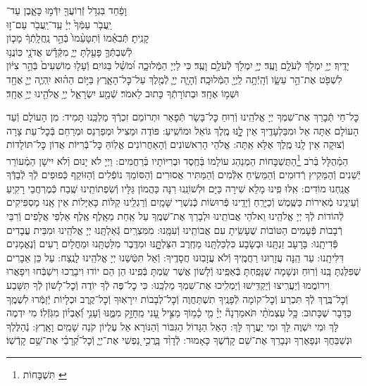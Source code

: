 \documentclass[twoside, openany, parskip=half, 11pt]{book}
\begin{document}
וָפַ֔חַד \hfill בִּגְדֹ֥ל זְֿרֽוֹעֲךָ֖ יִדְּֿמ֣וּ כָּאָ֑בֶן \hfill עַד־\\
יַֽעֲבֹ֤ר עַמְּֿךָ֙ יְיָ֔ \hfill עַֽד־יַֽעֲבֹ֖ר עַם־ז֣וּ \\
קָנִֽיתָ׃ \hfill תְּֿבִאֵ֗מוֹ וְֿתִטָּעֵ֨מוֹ֙ בְּֿהַ֣ר נַֽחֲלָֽתְֿךָ֔ \hfill מָכ֧וֹן \\
לְֿשִׁבְתְּֿךָ֛ פָּעַ֖לְתָּ יְיָ֑ \hfill מִקְּֿדָ֕שׁ אֲדֹנָ֖י כּֽוֹנֲנ֥וּ \\
יָדֶֽיךָ׃ \hfill יְיָ֥ יִמְלֹ֖ךְ לְֿעֹלָ֥ם וָעֶֽד׃\hfill \break
יְיָ֥ יִמְלֹ֖ךְ לְֿעֹלָ֥ם וָעֶֽד׃
כִּי לַיְיָ הַמְּֿלוּכָ֑ה וּ֝מֹשֵׁ֗ל בַּגּוֹיִֽם׃
וְֿעָל֤וּ מֽוֹשִׁעִים֙ בְּֿהַ֣ר צִיּ֔וֹן לִשְׁפֹּ֖ט אֶת־הַ֣ר עֵשָׂ֑ו וְֿהָֽיְֿתָ֥ה לַֽיְיָ֖ הַמְּֿלוּכָֽה׃
וְֿהָיָ֧ה יְיָ֛ לְֿמֶ֖לֶךְ עַל־כׇּל־הָאָ֑רֶץ בַּיּ֣וֹם הַה֗וּא יִֽהְיֶ֧ה יְיָ֛ אֶחָ֖ד וּשְׁמ֥וֹ אֶחָֽד׃
וּבְתוֹרָתְֿךָ כָּתוּב לֵאמֹר׃
שְֿׁמַ֖ע יִשְׂרָאֵ֑ל יְיָ֥ אֱלֹהֵ֖ינוּ יְיָ֥ אֶחָֽד׃

\enlargethispage{.5\baselineskip}
\label{nishmas}
כׇּל־חַי תְּֿבָרֵךְ אֶת־שִׁמְךָ יְיָ אֱלֹהֵֽינוּ וְֿרֽוּחַ כׇּל־בָּשָׂר תְּֿפָאֵר וּתְרוֹמֵם זִכְרְֿךָ מַלְכֵּֽנוּ תָּמִיד: מִן הָעוֹלָם וְֿעַד הָעוֹלָם אַתָּה אֵל וּמִבַּלְעָדֶֽיךָ אֵין לׇׇָֽנּוּ מֶֽלֶךְ גּוֹאֵל וּמוֹשִֽׁיעַ:
פּוֹדֶה וּמַצִיל וּמְפַרְנֵס וּמְרַחֵם בְּֿכׇל־עֵת צָרָה וְֿצוּקָה אֵין לָֽנוּ מֶֽלֶךְ אֶלָּא אַֽתָּה: אֱלֹהֵי הָרִאשׁוֹנִים וְֿהָאַחֲרוֹנִים אֱלֽוֹהַּ כׇּל־בְּֿרִיּוֹת אֲדוֹן כׇּל־תּוֹלָדוֹת הַמְֿהֻלָּל בְּֿרֹב \footnote{תִּשְׁבָּחוֹת \label{xx}}הַתֻּשְׁבָּחוֹת הַמְנַהֵג עוֹלָמוֹ בְּֿחֶֽסֶד וּבְרִיּוֹתָיו בְּֿרַחֲמִים: וַיְיָ לֹא יָנוּם וְֿלֹא יִישָׁן הַמְֿעוֹרֵר יְֿשֵׁנִים וְֿהַמֵּקִיץ רְֿדוּמִים וְֿהַמֵּשִֽׂיחַ אִלְּֿמִים וְֿהַמַּתִּיר אֲסוּרִים וְֿהַסּוֹמֵךְ נוֹפְֿלִים וְֿהַזּוֹקֵף כְּֿפוּפִים לְֿךָ לְֿבַדְּֿךָ אֲנַֽחְנוּ מוֹדִים: אִֽלּוּ פִֽינוּ מָלֵא שִׁירָה כַּיָּם וּלְשׁוֹנֵֽנוּ רִנָּה כַּהֲמוֹן גַּלָּיו וְֿשִׂפְתוֹתֵֽינוּ שֶֽׁבַח כְּֿמֶרְחֲבֵי רָקִֽיעַ וְֿעֵינֵֽינוּ מְֿאִירוֹת כַּשֶּֽׁמֶשׁ וְֿכַיָּרֵֽחַ וְֿיָדֵֽינוּ פְּֿרוּשׂוֹת כְּֿנִשְׁרֵי שָּׁמָֽיִם וְֿרַגְלֵֽינוּ קַלּוֹת כָּאַיָּלוֹת אֵין אָֽנוּ מַסְפִּיקִים לְֿהוֹדוֹת לְֿךָ יְיָ אֱלֹהֵֽינוּ וֵאלֹהֵי אֲבוֹתֵֽינוּ וּלְבָרֵךְ אֶת־שְׁמֶֽךָ עַל אַֽחַת מֵאָֽלֶף אֶֽלֶף אַלְפֵי אֲלָפִים וְֿרִבֵּי רְֿבָבוֹת פְּֿעָמִים הַטּוֹבוֹת שֶׁעָשִֽׂיתָ עִם אֲבוֹתֵֽינוּ וְֿעִמָּֽנוּ: מִמִּצְרַֽיִם גְּֿאַלְתָּֽנוּ יְיָ אֱלֹהֵֽינוּ וּמִבֵּית עֲבָדִים פְּֿדִיתָֽנוּ: בָּרָעָב זַנְתָּֽנוּ וּבְשָׂבָע כִּלְכַּלְתָּֽנוּ מֵחֶֽרֶב הִצַּלְתׇׇָּֽנּוּ וּמִדֶּֽבֶר מִלַּטְתָּֽנוּ וּמֵחֳלָיִם רָעִים וְֿנֶאֱמָנִים דִּלִּיתָֽנוּ: עַד הֵֽנָּה עֲזָרֽוּנוּ רַחֲמֶֽיךָ וְֿלֹא עֲזָבֽוּנוּ חֲסָדֶֽיךָ: וְֿאַל תִּטְּֿשֵׁנוּ יְיָ אֱלֹהֵֽינוּ לָנֶֽצַח: עַל כֵּן אֵבָרִים שֶׁפִּלַּגְתָּ בָּֽנוּ וְֿרֽוּחַ וּנְשָׁמָה שֶׁנָּפַֽחְתָּ בְּֿאַפֵּֽינוּ וְֿלָשׁוֹן אֲשֶׁר שַֽׂמְתָּ בְּֿפִֽינוּ הֵן הֵם יוֹדוּ וִיבָרֲכוּ וִישַׁבְּֿחוּ וִיפָאֲרוּ וִירוֹמֲמוּ וְֿיַעֲרִֽיצוּ וְֿיַקְדִּֽישׁוּ וְֿיַמְלִֽיכוּ אֶת־שִׁמְךָ מַלְכֵּֽנוּ: כִּי כׇל־פֶּה לְֿךָ יוֹדֶה וְֿכׇל־לָשׁוֹן לְֿךָ תִּשָּׁבַע וְֿכׇל־בֶּֽרֶךְ לְֿךָ תִּכְרַע וְֿכׇל־קוֹמָה לְֿפָנֶֽיךָ תִשְׁתַּחֲוֶה וְֿכׇל־לְבָבוֹת יִירָאֽוּךָ וְֿכׇל־קֶֽרֶב וּכְלָיוֹת יְֿזַמְּֿרוּ לִשְׁמֶֽךָ כַּדָּבָר שֶׁכָּתוּב:
כָּ֥ל עַצְמֹתַ֨י תֹּאמַרְנָה֘ יְיָ֗ מִ֤י כָ֫מ֥וֹךָ מַצִּ֣יל עָ֭נִי מֵֽחָזָ֣ק מִמֶּ֑נּוּ וְֿעָנִ֥י וְֿ֝אֶבְי֗וֹן מִגֹּֽזְֿלֽוֹ׃ מִי יִדְמֶה לָּךְ וּמִי יִשְׁוֶה לָּךְ וּמִי יַעֲרָךְ לָּךְ: הָאֵל הַגָּדוֹל הַגִּבּוֹר וְֿהַנּוֹרָא אֵל עֶלְיוֹן קֹנֵה שָׁמַֽיִם וָאָֽרֶץ:
נְֿהַלֶּלְךָ וּנְשַׁבֵּחֲךָ וּנְפָאֶרְךָ וּנְבָרֵךְ אֶת־שֵׁם קָדְֿשֶׁךָ כָּאָמוּר:
לְֿדָוִ֨ד בָּֽרֲכִ֣י נַ֭פְשִׁי אֶת־יְיָ֑ וְֿכׇל־קְ֝רָבַ֗י אֶת־שֵׁ֥ם קָדְֿשֽׁוֹ׃
\end{document}
